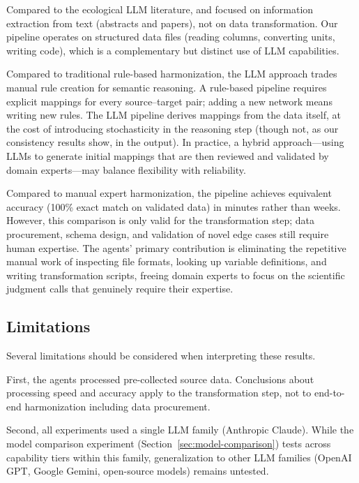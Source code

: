 \documentclass[review,authoryear]{elsarticle}
\begin{document}
Compared to the ecological LLM literature, \citet{scheepens2024llm} and \citet{gougherty2024llm} focused on information extraction from text (abstracts and papers), not on data transformation. Our pipeline operates on structured data files (reading columns, converting units, writing code), which is a complementary but distinct use of LLM capabilities.

Compared to traditional rule-based harmonization, the LLM approach trades manual rule creation for semantic reasoning. A rule-based pipeline requires explicit mappings for every source--target pair; adding a new network means writing new rules. The LLM pipeline derives mappings from the data itself, at the cost of introducing stochasticity in the reasoning step (though not, as our consistency results show, in the output). In practice, a hybrid approach---using LLMs to generate initial mappings that are then reviewed and validated by domain experts---may balance flexibility with reliability.

Compared to manual expert harmonization, the pipeline achieves equivalent accuracy (100\% exact match on validated data) in minutes rather than weeks. However, this comparison is only valid for the transformation step; data procurement, schema design, and validation of novel edge cases still require human expertise. The agents' primary contribution is eliminating the repetitive manual work of inspecting file formats, looking up variable definitions, and writing transformation scripts, freeing domain experts to focus on the scientific judgment calls that genuinely require their expertise.

\subsection{Limitations}
\label{sec:limitations}

Several limitations should be considered when interpreting these results.

First, the agents processed pre-collected source data. Conclusions about processing speed and accuracy apply to the transformation step, not to end-to-end harmonization including data procurement.

Second, all experiments used a single LLM family (Anthropic Claude). While the model comparison experiment (Section~\ref{sec:model-comparison}) tests across capability tiers within this family, generalization to other LLM families (OpenAI GPT, Google Gemini, open-source models) remains untested.
\end{document}
